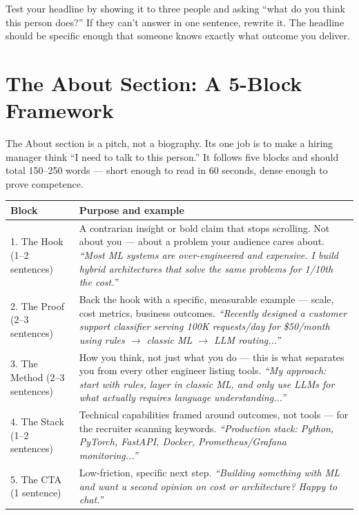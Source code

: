 \begin{keytakeaway}
Test your headline by showing it to three people and asking ``what do you think this person does?'' If they can't
answer in one sentence, rewrite it. The headline should be specific enough that someone knows exactly what outcome
you deliver.
\end{keytakeaway}

\section{The About Section: A 5-Block Framework}

The About section is a pitch, not a biography. Its one job is to make a hiring manager think ``I need to talk to
this person.'' It follows five blocks and should total 150--250 words --- short enough to read in 60 seconds,
dense enough to prove competence.

\begin{longtable}{p{} p{}}
\toprule
\textbf{Block} & \textbf{Purpose and example} \\
\midrule
\endhead
1. The Hook (1--2 sentences) & A contrarian insight or bold claim that stops scrolling. Not about you --- about a
problem your audience cares about. \emph{``Most ML systems are over-engineered and expensive. I build hybrid
architectures that solve the same problems for 1/10th the cost.''} \\
2. The Proof (2--3 sentences) & Back the hook with a specific, measurable example --- scale, cost metrics,
business outcomes. \emph{``Recently designed a customer support classifier serving 100K requests/day for
\$50/month using rules $\rightarrow$ classic ML $\rightarrow$ LLM routing...''} \\
3. The Method (2--3 sentences) & How you think, not just what you do --- this is what separates you from every
other engineer listing tools. \emph{``My approach: start with rules, layer in classic ML, and only use LLMs for
what actually requires language understanding...''} \\
4. The Stack (1--2 sentences) & Technical capabilities framed around outcomes, not tools --- for the recruiter
scanning keywords. \emph{``Production stack: Python, PyTorch, FastAPI, Docker, Prometheus/Grafana monitoring...''}
\\
5. The CTA (1 sentence) & Low-friction, specific next step. \emph{``Building something with ML and want a second
opinion on cost or architecture? Happy to chat.''} \\
\bottomrule
\end{longtable}

